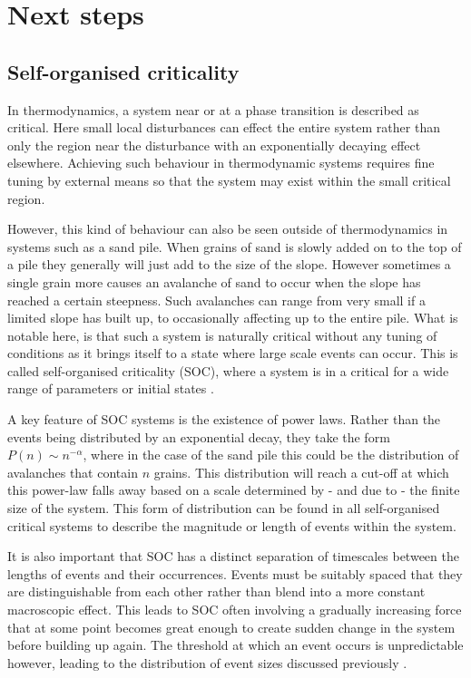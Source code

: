\documentclass{article}
\numberwithin{equation}{section}
\begin{document}
\section{Next steps}
\subsection{Self-organised criticality}
In thermodynamics, a system near or at a phase transition is described as critical. Here small local disturbances can effect the entire system rather than only the region near the disturbance with an exponentially decaying effect elsewhere. Achieving such behaviour in thermodynamic systems requires fine tuning by external means so that the system may exist within the small critical region.

However, this kind of behaviour can also be seen outside of thermodynamics in systems such as a sand pile. When grains of sand is slowly added on to the top of a pile they generally will just add to the size of the slope. However sometimes a single grain more causes an avalanche of sand to occur when the slope has reached a certain steepness. Such avalanches can range from very small if a limited slope has built up, to occasionally affecting up to the entire pile. What is notable here, is that such a system is naturally critical without any tuning of conditions as it brings itself to a state where large scale events can occur. This is called self-organised criticality (SOC), where a system is in a critical for a wide range of parameters or initial states \cite{Tang1993SOCState, Jensen1998Self-organizedSystems}.

A key feature of SOC systems is the existence of power laws. Rather than the events being distributed by an exponential decay, they take the form $P(n)\sim n^{-\alpha}$, where in the case of the sand pile this could be the distribution of avalanches that contain $n$ grains. This distribution will reach a cut-off at which this power-law falls away based on a scale determined by - and due to - the finite size of the system. This form of distribution can be found in all self-organised critical systems to describe the magnitude or length of events within the system.

It is also important that SOC has a distinct separation of timescales between the lengths of events and their occurrences. Events must be suitably spaced that they are distinguishable from each other rather than blend into a more constant macroscopic effect. This leads to SOC often involving a gradually increasing force that at some point becomes great enough to create sudden change in the system before building up again. The threshold at which an event occurs is unpredictable however, leading to the distribution of event sizes discussed previously \cite{Jensen1998Self-organizedSystems}.
\end{document}
